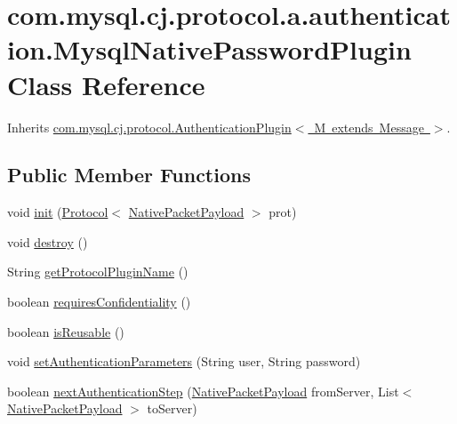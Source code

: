 \hypertarget{classcom_1_1mysql_1_1cj_1_1protocol_1_1a_1_1authentication_1_1_mysql_native_password_plugin}{}\section{com.\+mysql.\+cj.\+protocol.\+a.\+authentication.\+Mysql\+Native\+Password\+Plugin Class Reference}
\label{classcom_1_1mysql_1_1cj_1_1protocol_1_1a_1_1authentication_1_1_mysql_native_password_plugin}


Inherits \mbox{\hyperlink{interfacecom_1_1mysql_1_1cj_1_1protocol_1_1_authentication_plugin}{com.\+mysql.\+cj.\+protocol.\+Authentication\+Plugin$<$ M extends Message $>$}}.

\subsection*{Public Member Functions}
\begin{DoxyCompactItemize}
\item 
void \mbox{\hyperlink{classcom_1_1mysql_1_1cj_1_1protocol_1_1a_1_1authentication_1_1_mysql_native_password_plugin_a327634321a57f021e272e860cfadd196}{init}} (\mbox{\hyperlink{interfacecom_1_1mysql_1_1cj_1_1protocol_1_1_protocol}{Protocol}}$<$ \mbox{\hyperlink{classcom_1_1mysql_1_1cj_1_1protocol_1_1a_1_1_native_packet_payload}{Native\+Packet\+Payload}} $>$ prot)
\item 
void \mbox{\hyperlink{classcom_1_1mysql_1_1cj_1_1protocol_1_1a_1_1authentication_1_1_mysql_native_password_plugin_aaf129d7de527f4b5f703903067f44f5f}{destroy}} ()
\item 
String \mbox{\hyperlink{classcom_1_1mysql_1_1cj_1_1protocol_1_1a_1_1authentication_1_1_mysql_native_password_plugin_ad008264c483755da1987a7a9a6401039}{get\+Protocol\+Plugin\+Name}} ()
\item 
boolean \mbox{\hyperlink{classcom_1_1mysql_1_1cj_1_1protocol_1_1a_1_1authentication_1_1_mysql_native_password_plugin_afec5c68644de44be777a78a96e1fabd7}{requires\+Confidentiality}} ()
\item 
boolean \mbox{\hyperlink{classcom_1_1mysql_1_1cj_1_1protocol_1_1a_1_1authentication_1_1_mysql_native_password_plugin_a70160aeab582b3ddfbe93a80b46d2a4e}{is\+Reusable}} ()
\item 
void \mbox{\hyperlink{classcom_1_1mysql_1_1cj_1_1protocol_1_1a_1_1authentication_1_1_mysql_native_password_plugin_a24947d4cf7090930c52d6451e87c027f}{set\+Authentication\+Parameters}} (String user, String password)
\item 
boolean \mbox{\hyperlink{classcom_1_1mysql_1_1cj_1_1protocol_1_1a_1_1authentication_1_1_mysql_native_password_plugin_a5ff368882987df231f558c6c160ad860}{next\+Authentication\+Step}} (\mbox{\hyperlink{classcom_1_1mysql_1_1cj_1_1protocol_1_1a_1_1_native_packet_payload}{Native\+Packet\+Payload}} from\+Server, List$<$ \mbox{\hyperlink{classcom_1_1mysql_1_1cj_1_1protocol_1_1a_1_1_native_packet_payload}{Native\+Packet\+Payload}} $>$ to\+Server)
\end{DoxyCompactItemize}


